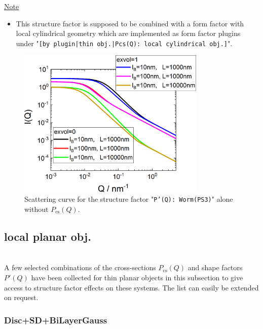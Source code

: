 \noindent
\underline{Note}
\begin{itemize}
  \item This structure factor is supposed to be combined with a form factor with local cylindrical geometry which are implemented as form factor plugins
under "\texttt{[by plugin|thin obj.|Pcs(Q): local cylindrical obj.]}".
\end{itemize}

\begin{figure}[htb]
\begin{center}
\includegraphics[width=0.8\textwidth]{../images/form_factor/polymer_semiflexible/PprimeWormPS3.png}
\end{center}
\caption{Scattering curve for the structure factor "\texttt{P'(Q): Worm(PS3)}" alone without $P_\mathrm{cs}(Q)$.}
\label{fig_IQ:PprimeWormPS3}
\end{figure}

\clearpage
\subsection{local planar  obj.} ~\\
\label{plugin:LocalPlanar)}
A few selected combinations of the cross-sections $P_\mathrm{cs}(Q)$ and shape factors $P'(Q)$ have been collected for thin planar objects in this subsection to give access to structure factor effects on these systems. The list can easily be extended on request.

\vspace{5mm}

\noindent
\subsubsection{Disc+SD+BiLayerGauss} ~\\

